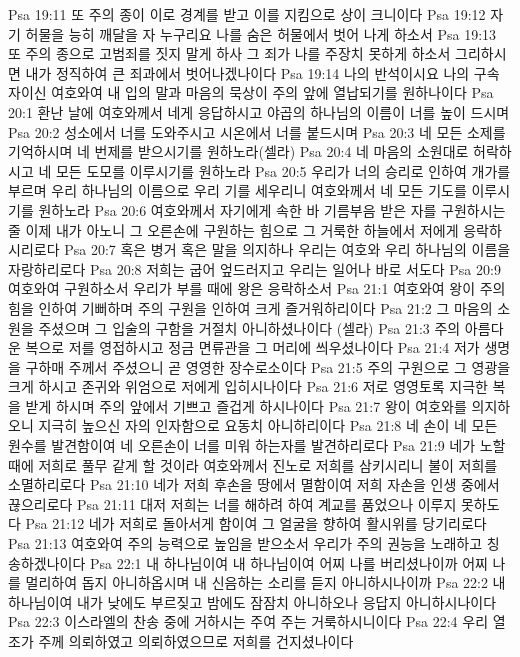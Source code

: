 Psa 19:11  또 주의 종이 이로 경계를 받고 이를 지킴으로 상이 크니이다
Psa 19:12  자기 허물을 능히 깨달을 자 누구리요 나를 숨은 허물에서 벗어 나게 하소서
Psa 19:13  또 주의 종으로 고범죄를 짓지 말게 하사 그 죄가 나를 주장치 못하게 하소서 그리하시면 내가 정직하여 큰 죄과에서 벗어나겠나이다
Psa 19:14  나의 반석이시요 나의 구속자이신 여호와여 내 입의 말과 마음의 묵상이 주의 앞에 열납되기를 원하나이다
Psa 20:1  환난 날에 여호와께서 네게 응답하시고 야곱의 하나님의 이름이 너를 높이 드시며
Psa 20:2  성소에서 너를 도와주시고 시온에서 너를 붙드시며
Psa 20:3  네 모든 소제를 기억하시며 네 번제를 받으시기를 원하노라(셀라)
Psa 20:4  네 마음의 소원대로 허락하시고 네 모든 도모를 이루시기를 원하노라
Psa 20:5  우리가 너의 승리로 인하여 개가를 부르며 우리 하나님의 이름으로 우리 기를 세우리니 여호와께서 네 모든 기도를 이루시기를 원하노라
Psa 20:6  여호와께서 자기에게 속한 바 기름부음 받은 자를 구원하시는줄 이제 내가 아노니 그 오른손에 구원하는 힘으로 그 거룩한 하늘에서 저에게 응락하시리로다
Psa 20:7  혹은 병거 혹은 말을 의지하나 우리는 여호와 우리 하나님의 이름을 자랑하리로다
Psa 20:8  저희는 굽어 엎드러지고 우리는 일어나 바로 서도다
Psa 20:9  여호와여 구원하소서 우리가 부를 때에 왕은 응락하소서
Psa 21:1  여호와여 왕이 주의 힘을 인하여 기뻐하며 주의 구원을 인하여 크게 즐거워하리이다
Psa 21:2  그 마음의 소원을 주셨으며 그 입술의 구함을 거절치 아니하셨나이다 (셀라)
Psa 21:3  주의 아름다운 복으로 저를 영접하시고 정금 면류관을 그 머리에 씌우셨나이다
Psa 21:4  저가 생명을 구하매 주께서 주셨으니 곧 영영한 장수로소이다
Psa 21:5  주의 구원으로 그 영광을 크게 하시고 존귀와 위엄으로 저에게 입히시나이다
Psa 21:6  저로 영영토록 지극한 복을 받게 하시며 주의 앞에서 기쁘고 즐겁게 하시나이다
Psa 21:7  왕이 여호와를 의지하오니 지극히 높으신 자의 인자함으로 요동치 아니하리이다
Psa 21:8  네 손이 네 모든 원수를 발견함이여 네 오른손이 너를 미워 하는자를 발견하리로다
Psa 21:9  네가 노할 때에 저희로 풀무 같게 할 것이라 여호와께서 진노로 저희를 삼키시리니 불이 저희를 소멸하리로다
Psa 21:10  네가 저희 후손을 땅에서 멸함이여 저희 자손을 인생 중에서 끊으리로다
Psa 21:11  대저 저희는 너를 해하려 하여 계교를 품었으나 이루지 못하도다
Psa 21:12  네가 저희로 돌아서게 함이여 그 얼굴을 향하여 활시위를 당기리로다
Psa 21:13  여호와여 주의 능력으로 높임을 받으소서 우리가 주의 권능을 노래하고 칭송하겠나이다
Psa 22:1  내 하나님이여 내 하나님이여 어찌 나를 버리셨나이까 어찌 나를 멀리하여 돕지 아니하옵시며 내 신음하는 소리를 듣지 아니하시나이까
Psa 22:2  내 하나님이여 내가 낮에도 부르짖고 밤에도 잠잠치 아니하오나 응답지 아니하시나이다
Psa 22:3  이스라엘의 찬송 중에 거하시는 주여 주는 거룩하시니이다
Psa 22:4  우리 열조가 주께 의뢰하였고 의뢰하였으므로 저희를 건지셨나이다
